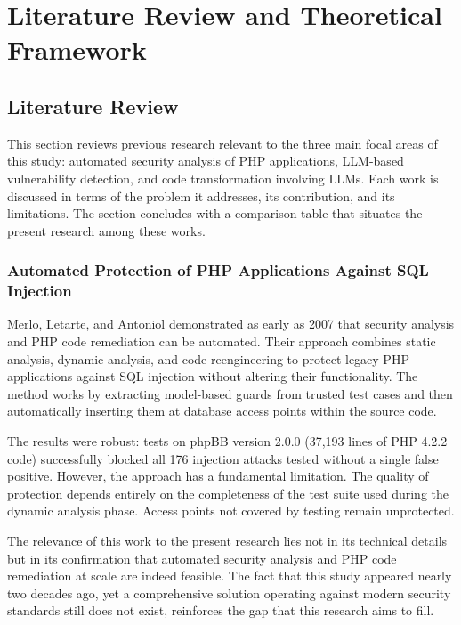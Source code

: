 
\chapter{Literature Review and Theoretical Framework}

\section{Literature Review}

This section reviews previous research relevant to the three main focal areas of this study: automated security analysis of PHP applications, LLM-based vulnerability detection, and code transformation involving LLMs. Each work is discussed in terms of the problem it addresses, its contribution, and its limitations. The section concludes with a comparison table that situates the present research among these works.

\subsection{Automated Protection of PHP Applications Against SQL Injection}

Merlo, Letarte, and Antoniol \cite{merlo2007automated} demonstrated as early as 2007 that security analysis and PHP code remediation can be automated. Their approach combines static analysis, dynamic analysis, and code reengineering to protect legacy PHP applications against SQL injection without altering their functionality. The method works by extracting model-based guards from trusted test cases and then automatically inserting them at database access points within the source code.

The results were robust: tests on phpBB version 2.0.0 (37,193 lines of PHP 4.2.2 code) successfully blocked all 176 injection attacks tested without a single false positive. However, the approach has a fundamental limitation. The quality of protection depends entirely on the completeness of the test suite used during the dynamic analysis phase. Access points not covered by testing remain unprotected.

The relevance of this work to the present research lies not in its technical details but in its confirmation that automated security analysis and PHP code remediation at scale are indeed feasible. The fact that this study appeared nearly two decades ago, yet a comprehensive solution operating against modern security standards still does not exist, reinforces the gap that this research aims to fill.

